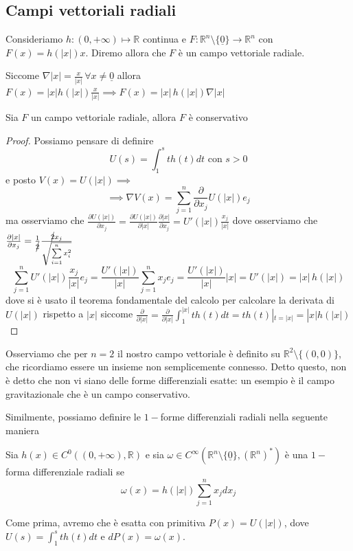 \subsection{Campi vettoriali radiali}
\begin{definition}
	Consideriamo $h: (0, +\infty) \mapsto \mathbb{R}$ continua e $F: \mathbb{R}^n \setminus \{\underline{0} \} \to \mathbb{R}^n$ con $F(x) = h(|x|)x$.
	Diremo allora che $F$ è un campo vettoriale radiale.
\end{definition}
\begin{remark}
Siccome $\nabla |x| = \frac{x}{|x|} \, \forall x \neq \underline{0}$ allora $F(x) = |x|h(|x|)\frac{x}{|x|} \implies F(x) = |x| \, h(|x|)\nabla |x|$
\end{remark}
\begin{prop}
	Sia $F$ un campo vettoriale radiale, allora $F$ è conservativo
\end{prop}
\begin{proof}
	Possiamo pensare di definire
	$$
	U(s) = \int_1^s t h(t)dt \text{ con } s > 0 
	$$
	e posto $V(x) = U(|x|) \implies$
	$$
	\implies \nabla V(x) = \sum_{j=1}^n \frac{\partial}{\partial x_j} U(|x|)e_j
	$$
	ma osserviamo che $\frac{\partial U(|x|)}{\partial x_j} = \frac{\partial U(|x|)}{\partial |x|} \frac{\partial |x|}{\partial x_j} = U'(|x|) \frac{x_j}{|x|}$ dove osserviamo che $\frac{\partial |x|}{\partial x_j} = \frac{1}{\cancel{2}} \frac{\cancel{2}x_j}{\sqrt{\sum\limits_{i=1}^n x_i^2}}$
	$$
		\sum_{j=1}^n U'(|x|) \frac{x_j}{|x|}e_j = \frac{U'(|x|)}{|x|} \sum_{j=1}^n x_j e_j = \frac{U'(|x|)}{|x|} |x| = U'(|x|) = |x| \, h(|x|)
	$$
	dove si è usato il teorema fondamentale del calcolo per calcolare la derivata di $U(|x|)$ rispetto a $|x|$ siccome $\frac{\partial}{\partial |x|} = \frac{\partial}{\partial |x|} \int_1^{|x|} t h(t) dt = th(t)|_{t=|x|} = |x|h(|x|)$
\end{proof}
\begin{remark}
	Osserviamo che per $n=2$ il nostro campo vettoriale è definito su $\mathbb{R}^2 \setminus \{ (0, 0) \}$, che ricordiamo essere un insieme non semplicemente connesso. Detto questo, non è detto che non vi siano delle forme differenziali esatte: un esempio
	è il campo gravitazionale che è un campo conservativo.
\end{remark}
Similmente, possiamo definire le $1-$forme differenziali radiali nella seguente maniera
\begin{definition}
	Sia $h(x) \in C^0((0, +\infty), \mathbb{R})$ e sia $\omega \in C^{\infty}(\mathbb{R}^n \setminus \{ \underline{0} \}, (\mathbb{R}^n)^*)$ è una $1-$ forma differenziale radiali se
	$$
		\omega(x) = h(|x|)\sum_{j=1}^n x_j dx_j
	$$
\end{definition}
Come prima, avremo che è esatta con primitiva $P(x)=U(|x|)$, dove $U(s) = \int_1^s th(t)dt$ e $dP(x)=\omega(x)$.